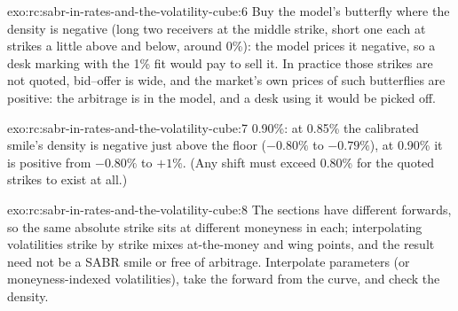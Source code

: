 \begin{solution}{exo:rc:sabr-in-rates-and-the-volatility-cube:6}
Buy the model's butterfly where the density is negative (long two receivers at
the middle strike, short one each at strikes a little above and below, around
0\%): the model prices it negative, so a desk marking with the 1\% fit would
pay to sell it. In practice those strikes are not quoted, bid--offer is wide,
and the market's own prices of such butterflies are positive: the arbitrage is
in the model, and a desk using it would be picked off.
\end{solution}

\begin{solution}{exo:rc:sabr-in-rates-and-the-volatility-cube:7}
0.90\%: at 0.85\% the calibrated smile's density is negative just above the
floor ($-0.80\%$ to $-0.79\%$), at 0.90\% it is positive from $-0.80\%$ to $+1\%$.
(Any shift must exceed 0.80\% for the quoted strikes to exist at all.)
\end{solution}

\begin{solution}{exo:rc:sabr-in-rates-and-the-volatility-cube:8}
The sections have different forwards, so the same absolute strike sits at
different moneyness in each; interpolating volatilities strike by strike mixes
at-the-money and wing points, and the result need not be a SABR smile or free
of arbitrage. Interpolate parameters (or moneyness-indexed volatilities), take
the forward from the curve, and check the density.
\end{solution}

